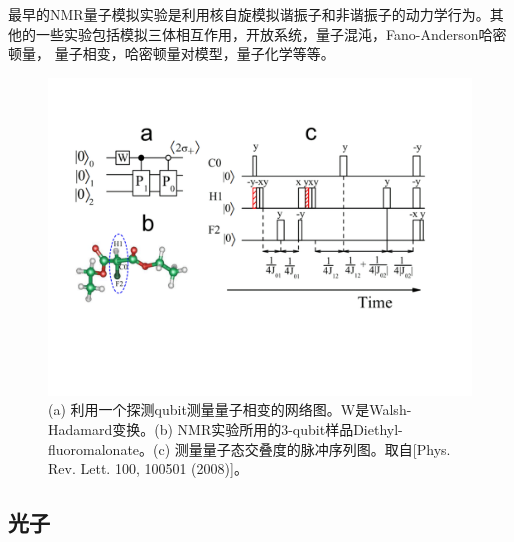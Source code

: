 最早的NMR量子模拟实验是利用核自旋模拟谐振子和非谐振子的动力学行为\cite{nmrsim1}。其他的一些实验包括模拟三体相互作用\cite{nmrsim2,app15}，开放系统\cite{nmrsim3}，量子混沌\cite{chaos2}，Fano-Anderson哈密顿量\cite{nmrsim4}，
量子相变\cite{nmrsim5,nmrsimphase,app16}，哈密顿量对模型\cite{nmrsim6}，量子化学等等\cite{static,dynamical,yexiao}。
\begin{figure}[htbp]
            \begin{center}
              \includegraphics[width= 0.8\columnwidth]{figures/nmrsim.pdf}
              \caption{(a) 利用一个探测qubit测量量子相变的网络图。W是Walsh-Hadamard变换。(b) NMR实验所用的3-qubit样品Diethyl-fluoromalonate。(c) 测量量子态交叠度的脉冲序列图。取自[Phys. Rev. Lett. 100, 100501 (2008)\cite{nmrsimphase}]。
              }
              \label{nmrsim}
            \end{center}
        \end{figure}

\subsection{光子}

